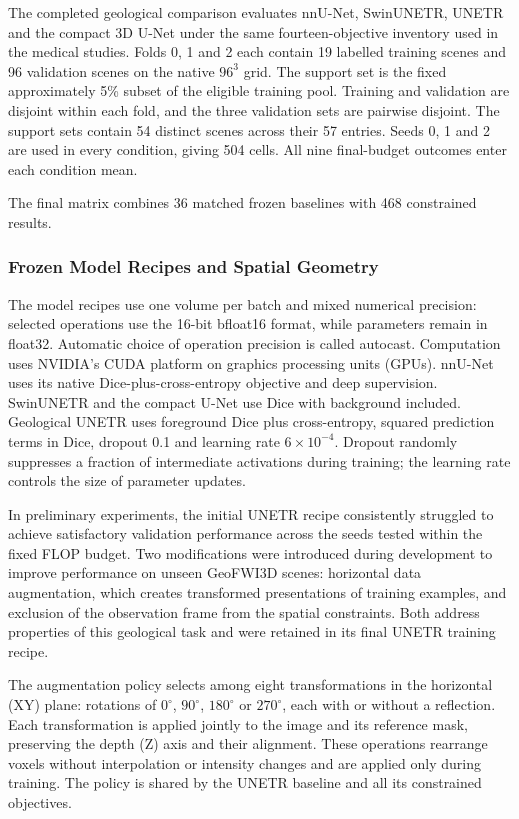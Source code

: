 \documentclass[12pt,a4paper]{article}
\begin{document}
The completed geological comparison evaluates nnU-Net, SwinUNETR,
UNETR and the compact 3D U-Net under the same fourteen-objective
inventory used in the medical studies. Folds 0, 1 and 2 each contain
19 labelled training scenes and 96 validation scenes on the native
$96^3$ grid. The support set is the fixed approximately 5\% subset
of the eligible training pool. Training and validation are disjoint
within each fold, and the three validation sets are pairwise disjoint.
The support sets contain 54 distinct scenes across their 57 entries.
Seeds 0, 1 and 2 are used in every condition, giving 504 cells.
All nine final-budget outcomes enter each condition mean.

The final matrix combines 36 matched frozen baselines with 468
constrained results. 

\subsubsection{Frozen Model Recipes and Spatial Geometry}

The model recipes use one volume per batch and mixed numerical precision:
selected operations use the 16-bit bfloat16 format, while parameters remain
in float32. Automatic choice of operation precision is called autocast.
Computation uses NVIDIA's CUDA platform on graphics processing units (GPUs).
nnU-Net uses its native Dice-plus-cross-entropy objective and deep
supervision. SwinUNETR and the compact U-Net use Dice with background
included. Geological UNETR uses foreground Dice plus cross-entropy, squared
prediction terms in Dice, dropout 0.1 and learning rate $6\times10^{-4}$.
Dropout randomly suppresses a fraction of intermediate activations during
training; the learning rate controls the size of parameter updates.

In preliminary experiments, the initial UNETR recipe consistently struggled
to achieve satisfactory validation performance across the seeds tested
within the fixed FLOP budget. Two modifications were introduced during
development to improve performance on unseen GeoFWI3D scenes: horizontal
data augmentation, which creates transformed presentations of training
examples, and exclusion of the observation frame from the spatial
constraints. Both address properties of this geological task and were
retained in its final UNETR training recipe.

The augmentation policy selects among eight transformations in the
horizontal (XY) plane: rotations of $0^\circ$, $90^\circ$, $180^\circ$
or $270^\circ$, each with or without a reflection. Each transformation
is applied jointly to the image and its reference mask, preserving the
depth (Z) axis and their alignment. These operations rearrange voxels
without interpolation or intensity changes and are applied only during
training. The policy is shared by the UNETR baseline and all its
constrained objectives.
\end{document}
